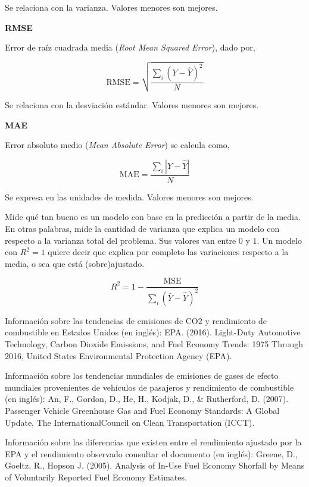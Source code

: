 \documentclass{article}
\begin{document}
    Se relaciona con la varianza. Valores menores son mejores.

\textbf{RMSE}

    Error de raíz cuadrada media (\textit{Root Mean Squared Error}), dado por,

    $$
    \text{RMSE} = \sqrt{\frac{\sum_{i} (Y - \hat{Y})^2}{N}}
    $$

    Se relaciona con la desviación estándar. Valores menores son mejores.

\textbf{MAE}

    Error absoluto medio (\textit{Mean Absolute Error}) se calcula como,

    $$
    \text{MAE} = \frac{\sum_i |Y - \hat{Y}|}{N}
    $$

    Se expresa en las unidades de medida. Valores menores son mejores.


    Mide qué tan bueno es un modelo con base en la predicción a partir de la media. En otras palabras, mide la cantidad de varianza que explica un modelo con respecto a la varianza total del problema. Sus valores van entre $0$ y $1$. Un modelo con $R^2 = 1$ quiere decir que explica por completo las variaciones respecto a la media, o sea que está (sobre)ajustado.
    
    $$
    R^2 = 1 - \frac{\text{MSE}}{\sum_i (\bar{Y} - \hat{Y})^2}
    $$





Información sobre las tendencias de emisiones de CO2 y rendimiento de combustible en Estados Unidos (en inglés):
EPA. (2016). Light-Duty Automotive Technology, Carbon Dioxide Emissions, and Fuel Economy Trends: 1975 Through 2016, United States Environmental Protection Agency (EPA).

Información sobre las tendencias mundiales de emisiones de gases de efecto mundiales provenientes de vehículos de pasajeros y rendimiento de combustible (en inglés):
An, F., Gordon, D., He, H., Kodjak, D., \& Rutherford, D. (2007). Passenger Vehicle Greenhouse Gas and Fuel Economy Standards: A Global Update, The InternationalCouncil on Clean Transportation (ICCT).

Información sobre las diferencias que existen entre el rendimiento ajustado por la EPA y el rendimiento observado consultar el documento (en inglés):
Greene, D., Goeltz, R., Hopson J. (2005). Analysis of In-Use Fuel Economy Shorfall by Means of Voluntarily Reported Fuel Economy Estimates.
\end{document}
